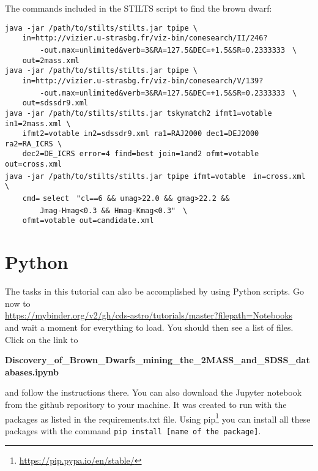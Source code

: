 \documentclass [a4paper, 12pt]{article}
\begin{document}
The commands included in the STILTS script to find the brown dwarf:\\
\begin{small}
\noindent\verb|java -jar /path/to/stilts/stilts.jar tpipe \| \\
\verb|    |
\textquotesingle
\verb|in=http://vizier.u-strasbg.fr/viz-bin/conesearch/II/246?| \\
\verb|        -out.max=unlimited&verb=3&RA=127.5&DEC=+1.5&SR=0.2333333|
\textquotesingle
\verb| \|\\
\verb|    out=2mass.xml| \\

\noindent\verb|java -jar /path/to/stilts/stilts.jar tpipe \| \\
\verb|    |
\textquotesingle
\verb|in=http://vizier.u-strasbg.fr/viz-bin/conesearch/V/139?| \\
\verb|        -out.max=unlimited&verb=3&RA=127.5&DEC=+1.5&SR=0.2333333|
\textquotesingle
\verb| \| \\
\verb|    out=sdssdr9.xml| \\

\noindent\verb|java -jar /path/to/stilts/stilts.jar tskymatch2 ifmt1=votable |
\verb|in1=2mass.xml \| \\
\verb|    ifmt2=votable in2=sdssdr9.xml ra1=RAJ2000 dec1=DEJ2000 |
\verb|ra2=RA_ICRS \| \\
\verb|    dec2=DE_ICRS error=4 find=best join=1and2 ofmt=votable |
\verb|out=cross.xml| \\

\noindent\verb|java -jar /path/to/stilts/stilts.jar tpipe ifmt=votable |
\verb|in=cross.xml \| \\
\verb|    cmd=|\textquotesingle
\verb|select |
\verb|"cl==6 && umag>22.0 && gmag>22.2 && |\\
\verb|        Jmag-Hmag<0.3 && Hmag-Kmag<0.3"|
\textquotesingle
\verb| \| \\
\verb|    ofmt=votable out=candidate.xml| \\
\end{small}


\section{Python}
The tasks in this tutorial can also be accomplished by using Python scripts.
Go now to \\
\url{https://mybinder.org/v2/gh/cds-astro/tutorials/master?filepath=Notebooks}\\
and wait a moment for everything to load. You should then see a list of files.
Click on the link to

\textbf{Discovery\_of\_Brown\_Dwarfs\_mining\_the\_2MASS\_and\_SDSS\_databases.ipynb}

\noindent and follow the instructions there. You can also download the Jupyter
notebook from the github repository to your machine. It was created to run with the packages as listed in the requirements.txt file. Using pip\footnote{\url{https://pip.pypa.io/en/stable/}} you can install all these packages with the command \texttt{pip install [name of the package]}.
%
\end{document}

